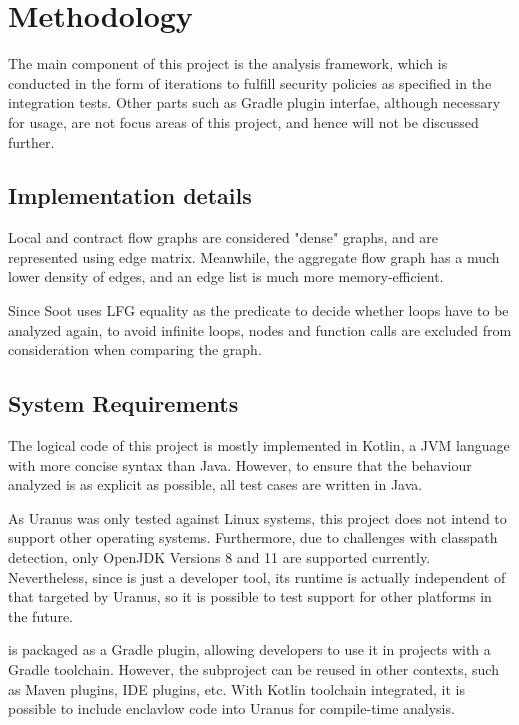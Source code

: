 \section{Methodology}\label{sec:methodology}
The main component of this project is the analysis framework,
which is conducted in the form of iterations
to fulfill security policies as specified in the integration tests.
Other parts such as Gradle plugin interfae,
although necessary for usage,
are not focus areas of this project, and hence will not be discussed further.



\subsection{Implementation details}\label{subsec:details}
Local and contract flow graphs are considered "dense" graphs,
and are represented using edge matrix.
Meanwhile, the aggregate flow graph has a much lower density of edges,
and an edge list is much more memory-efficient.

Since Soot uses \ac{LFG} equality as the predicate
to decide whether loops have to be analyzed again,
to avoid infinite loops,  nodes and function calls
are excluded from consideration when comparing the graph.

\subsection{System Requirements}\label{subsec:system-requirements}
The logical code of this project is mostly implemented in Kotlin,
a \ac{JVM} language with more concise syntax than Java.
However, to ensure that the behaviour analyzed
is as explicit as possible,
all test cases are written in Java.

As Uranus was only tested against Linux systems,
this project does not intend to support other operating systems.
Furthermore, due to challenges with classpath detection,
only OpenJDK Versions 8 and 11 are supported currently.
Nevertheless, since \pname{} is just a developer tool,
its runtime is actually independent of that targeted by Uranus,
so it is possible to test support for other platforms in the future.

\pname{} is packaged as a Gradle plugin,
allowing developers to use it in projects with a Gradle toolchain.
However, the  subproject can be reused in other contexts,
such as Maven plugins, IDE plugins, etc.
With Kotlin toolchain integrated,
it is possible to include enclavlow code into Uranus for compile-time analysis.

